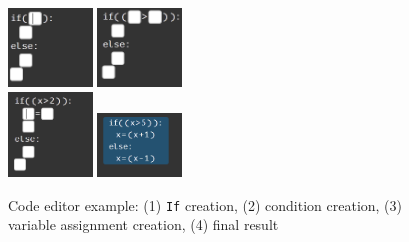 \begin{figure}
	\centering
	\includegraphics[width = 0.2\textwidth]{Figures/code_editor_step1} \includegraphics[width = 0.2\textwidth]{Figures/code_editor_step2}\\
	\vspace{0.1cm}
	\includegraphics[width = 0.2\textwidth]{Figures/code_editor_step3} \includegraphics[width = 0.2\textwidth]{Figures/code_editor_step4}
	\caption{Code editor example: (1) \texttt{If} creation, (2) condition creation, (3) variable assignment creation, (4) final result}
	\label{fig:code_editor_steps}
\end{figure}


